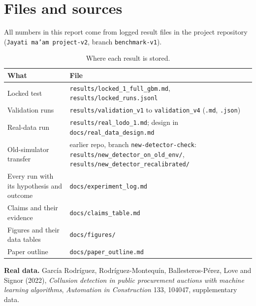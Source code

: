 \documentclass[11pt,a4paper]{article}
\begin{document}
\section{Files and sources}

All numbers in this report come from logged result files in the project repository (\texttt{Jayati ma'am project-v2}, branch \texttt{benchmark-v1}).

\begin{table}[H]
\centering
\small
\begin{tabular}{@{}p{5.6cm}p{8.4cm}@{}}
\toprule
What & File \\
\midrule
Locked test & \texttt{results/locked\_1\_full\_gbm.md}, \texttt{results/locked\_runs.jsonl} \\
Validation runs & \texttt{results/validation\_v1} to \texttt{validation\_v4} (\texttt{.md}, \texttt{.json}) \\
Real-data run & \texttt{results/real\_lodo\_1.md}; design in \texttt{docs/real\_data\_design.md} \\
Old-simulator transfer & earlier repo, branch \texttt{new-detector-check}: \texttt{results/new\_detector\_on\_old\_env/}, \texttt{results/new\_detector\_recalibrated/} \\
Every run with its hypothesis and outcome & \texttt{docs/experiment\_log.md} \\
Claims and their evidence & \texttt{docs/claims\_table.md} \\
Figures and their data tables & \texttt{docs/figures/} \\
Paper outline & \texttt{docs/paper\_outline.md} \\
\bottomrule
\end{tabular}
\caption{Where each result is stored.}
\end{table}

\textbf{Real data.} García Rodríguez, Rodríguez-Montequín, Ballesteros-Pérez, Love and Signor (2022), \emph{Collusion detection in public procurement auctions with machine learning algorithms}, \emph{Automation in Construction} 133, 104047, supplementary data.
\end{document}
